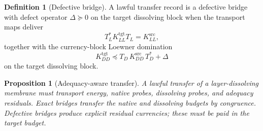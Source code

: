 \documentclass[11pt]{article}
\newcommand{\preceqq}{\preceq}
\newtheorem{proposition}[theorem]{Proposition}
\theoremstyle{definition}
\newtheorem{definition}[theorem]{Definition}
\begin{document}
\begin{definition}[Defective bridge]\label{def:main:defective-bridge}
A lawful transfer record is a defective bridge with defect operator
\(\Delta\succeq0\) on the target dissolving block when the transport
maps deliver
\[
  T_L^*K^{\mathrm{tgt}}_{LL}T_L=K^{\mathrm{src}}_{LL},
\]
together with the currency-block Loewner domination
\[
  K^{\mathrm{tgt}}_{DD}\preceqq
  T_D\,K^{\mathrm{src}}_{DD}\,T_D^*+\Delta
\]
on the target dissolving block.
\end{definition}

\begin{proposition}[Adequacy-aware transfer]\label{thm:main:adequacy-aware-transfer}
A lawful transfer of a layer-dissolving membrane must transport energy,
native probes, dissolving probes, and adequacy residuals.  Exact bridges
transfer the native and dissolving budgets by congruence.  Defective
bridges produce explicit residual currencies; these must be paid in the
target budget.
\end{proposition}
\end{document}
